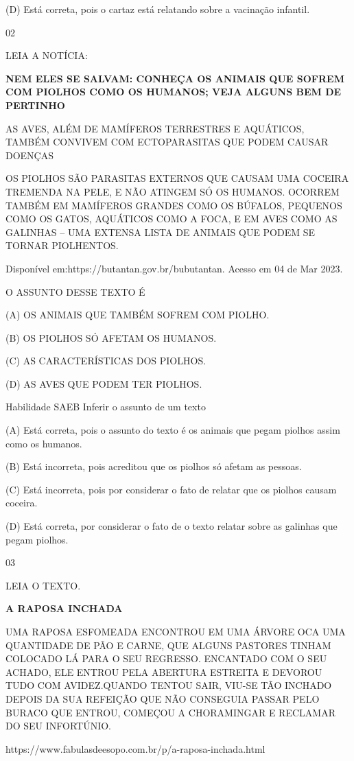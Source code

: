 {{(D) Está correta, pois o cartaz está relatando sobre a vacinação
infantil.

\num{02}

LEIA A NOTÍCIA:

\textbf{NEM ELES SE SALVAM: CONHEÇA OS ANIMAIS QUE SOFREM COM PIOLHOS
COMO OS HUMANOS; VEJA ALGUNS BEM DE PERTINHO}

AS AVES, ALÉM DE MAMÍFEROS TERRESTRES E AQUÁTICOS, TAMBÉM CONVIVEM COM
ECTOPARASITAS QUE PODEM CAUSAR DOENÇAS

OS PIOLHOS SÃO PARASITAS EXTERNOS QUE CAUSAM UMA COCEIRA TREMENDA NA
PELE, E NÃO ATINGEM SÓ OS HUMANOS. OCORREM TAMBÉM EM MAMÍFEROS GRANDES
COMO OS BÚFALOS, PEQUENOS COMO OS GATOS, AQUÁTICOS COMO A FOCA, E EM
AVES COMO AS GALINHAS -- UMA EXTENSA LISTA DE ANIMAIS QUE PODEM SE
TORNAR PIOLHENTOS.

Disponível em:https://butantan.gov.br/bubutantan. Acesso em 04 de Mar
2023.

O ASSUNTO DESSE TEXTO É

(A) OS ANIMAIS QUE TAMBÉM SOFREM COM PIOLHO.

(B) OS PIOLHOS SÓ AFETAM OS HUMANOS.

(C) AS CARACTERÍSTICAS DOS PIOLHOS.

(D) AS AVES QUE PODEM TER PIOLHOS.

Habilidade SAEB Inferir o assunto de um texto

(A) Está correta, pois o assunto do texto é os animais que pegam piolhos
assim como os humanos.

(B) Está incorreta, pois acreditou que os piolhos só afetam as pessoas.

(C) Está incorreta, pois por considerar o fato de relatar que os piolhos
causam coceira.

(D) Está correta, por considerar o fato de o texto relatar sobre as
galinhas que pegam piolhos.

\num{03}

LEIA O TEXTO.

\textbf{A RAPOSA INCHADA}

UMA RAPOSA ESFOMEADA ENCONTROU EM UMA ÁRVORE OCA UMA QUANTIDADE DE PÃO E
CARNE, QUE ALGUNS PASTORES TINHAM COLOCADO LÁ PARA O SEU REGRESSO.
ENCANTADO COM O SEU ACHADO, ELE ENTROU PELA ABERTURA ESTREITA E DEVOROU
TUDO COM AVIDEZ.QUANDO TENTOU SAIR, VIU-SE TÃO INCHADO DEPOIS DA SUA
REFEIÇÃO QUE NÃO CONSEGUIA PASSAR PELO BURACO QUE ENTROU, COMEÇOU A
CHORAMINGAR E RECLAMAR DO SEU INFORTÚNIO.

https://www.fabulasdeesopo.com.br/p/a-raposa-inchada.html

}}
